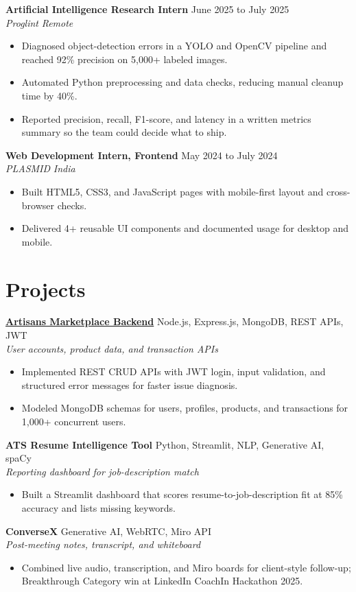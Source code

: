 \documentclass[a4paper,10pt]{article}
\newcommand{\entry}[4]{%
  \vspace{3pt}%
  \noindent\textbf{#1} \hfill #2\\[0.4pt]
  \textit{#3} \hfill \textit{#4}\par
  \vspace{1pt}%
}
\begin{document}
\entry{Artificial Intelligence Research Intern}{June 2025 to July 2025}
{Proglint}{Remote}
\begin{itemize}
  \item Diagnosed object-detection errors in a YOLO and OpenCV pipeline and reached 92\% precision on 5,000+ labeled images.
  \item Automated Python preprocessing and data checks, reducing manual cleanup time by 40\%.
  \item Reported precision, recall, F1-score, and latency in a written metrics summary so the team could decide what to ship.
\end{itemize}

\entry{Web Development Intern, Frontend}{May 2024 to July 2024}
{PLASMID}{India}
\begin{itemize}
  \item Built HTML5, CSS3, and JavaScript pages with mobile-first layout and cross-browser checks.
  \item Delivered 4+ reusable UI components and documented usage for desktop and mobile.
\end{itemize}

\section{Projects}
\entry{\href{https://github.com/daniyah-rehman}{Artisans Marketplace Backend}}{Node.js, Express.js, MongoDB, REST APIs, JWT}
{User accounts, product data, and transaction APIs}{}
\begin{itemize}
  \item Implemented REST CRUD APIs with JWT login, input validation, and structured error messages for faster issue diagnosis.
  \item Modeled MongoDB schemas for users, profiles, products, and transactions for 1,000+ concurrent users.
\end{itemize}

\entry{ATS Resume Intelligence Tool}{Python, Streamlit, NLP, Generative AI, spaCy}
{Reporting dashboard for job-description match}{}
\begin{itemize}
  \item Built a Streamlit dashboard that scores resume-to-job-description fit at 85\% accuracy and lists missing keywords.
\end{itemize}

\entry{ConverseX}{Generative AI, WebRTC, Miro API}
{Post-meeting notes, transcript, and whiteboard}{}
\begin{itemize}
  \item Combined live audio, transcription, and Miro boards for client-style follow-up; Breakthrough Category win at LinkedIn CoachIn Hackathon 2025.
\end{itemize}
\end{document}
